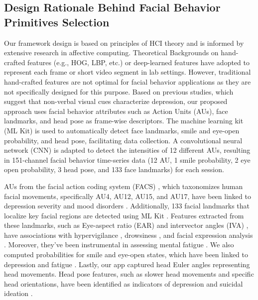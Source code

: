 \subsection{Design Rationale Behind Facial Behavior Primitives Selection}
\label{sec:DR}
Our framework design is based on principles of HCI theory and is informed by extensive research in affective computing. Theoretical Backgrounds on hand-crafted features (e.g., HOG, LBP, etc.) \cite{song2019dynamic, dhall2015temporally} or deep-learned \cite{zhou2018visually, jan2017artificial} features have adopted to represent each frame or short video segment in lab settings. However, traditional hand-crafted features are not optimal for facial behavior applications as they are not specifically designed for this purpose. Based on previous studies, which suggest that non-verbal visual cues characterize depression, our proposed approach uses facial behavior attributes such as Action Units (AUs), face landmarks, and head pose as frame-wise descriptors. The machine learning kit (ML Kit) \cite{mlkit} is used to automatically detect face landmarks, smile and eye-open probability, and head pose, facilitating data collection. A convolutional neural network (CNN) \cite{ertugrul2019cross} is adapted to detect the intensities of 12 different AUs, resulting in 151-channel facial behavior time-series data (12 AU, 1 smile probability, 2 eye open probability, 3 head pose, and 133 face landmarks) for each session. 
 
AUs from the facial action coding system (FACS) \cite{ekman1978facial}, which taxonomizes human facial movements, specifically AU4, AU12, AU15, and AU17, have been linked to depression severity \cite{song2020spectral, gavrilescu2019predicting} and mood disorders \cite{hong2019exploring, kollias2021affect}. Additionally, 133 facial landmarks that localize key facial regions are detected using ML Kit \cite{prabhu2017real}. Features extracted from these landmarks, such as Eye-aspect ratio (EAR) \cite{feng2020using} and intervector angles (IVA) \cite{islam2016sention}, have associations with hypervigilance \cite{benoit2005hypovigilence}, drowsiness \cite{maior2020real}, and facial expression analysis \cite{islam2016sention}. Moreover, they've been instrumental in assessing mental fatigue \cite{cheng2019assessment}. We also computed probabilities for smile and eye-open states, which have been linked to depression \cite{gehricke2000reduced} and fatigue \cite{zhang2017driver, kroencke2000fatigue}. Lastly, our app captured head Euler angles representing head movements. Head pose features, such as slower head movements and specific head orientations, have been identified as indicators of depression \cite{song2020spectral, alghowinem_head_2013} and suicidal ideation \cite{laksana2017investigating, eigbe2018toward}. 
 
